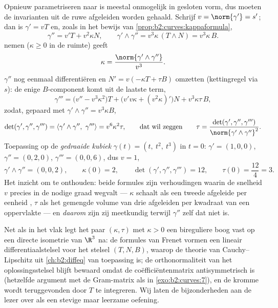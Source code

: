 \begin{example}\label{ex:b2:curves:twistedcubic}
Opnieuw parametriseren naar  is meestal onmogelijk in
gesloten vorm, dus moeten de invarianten uit de ruwe afgeleiden
worden gehaald. Schrijf $v = \norm{\gamma'} = s'$; dan is $\gamma'
= vT$ en, zoals in het bewijs van
\cref{prop:b2:curves:kappaformula},
\[
\gamma'' = v'T + v^2\kappa N,
\qquad
\gamma' \wedge \gamma'' = v^3\kappa\,(T \wedge N) =
v^3\kappa\,B .
\]
 nemen ($\kappa \geq 0$ in de ruimte) geeft
\[
\kappa = \frac{\norm{\gamma' \wedge \gamma''}}{v^3} .
\]
$\gamma''$ nog eenmaal differentiëren en $N' = v(-\kappa T + \tau
B)$ omzetten (kettingregel via $s$): de enige $B$-component komt
uit de laatste term,
\[
\gamma''' = \bigl(v'' - v^3\kappa^2\bigr)T +
\bigl(v'v\kappa + (v^2\kappa)'\bigr)N + v^3\kappa\tau\,B,
\]
zodat, gepaard met $\gamma' \wedge \gamma'' = v^3\kappa B$,
\[
\det(\gamma', \gamma'', \gamma''') = \langle\gamma' \wedge
\gamma'',\ \gamma'''\rangle = v^6\kappa^2\tau,
\qquad\text{dat wil zeggen}\qquad
\tau = \frac{\det(\gamma', \gamma'',
\gamma''')}{\norm{\gamma' \wedge \gamma''}^2} .
\]
Toepassing op de \emph{gedraaide kubiek} $\gamma(t) = (t,\ t^2,\
t^3)$ in $t = 0$: $\gamma' = (1, 0, 0)$, $\gamma'' = (0, 2, 0)$,
$\gamma''' = (0, 0, 6)$, dus $v = 1$,
\[
\gamma' \wedge \gamma'' = (0, 0, 2), \qquad \kappa(0) = 2,
\qquad
\det(\gamma', \gamma'', \gamma''') = 12, \qquad \tau(0) =
\frac{12}{4} = 3 .
\]
Het inzicht om te onthouden: beide formules zijn verhoudingen
waarin de snelheid $v$ precies in de nodige graad wegvalt ---
$\kappa$ schaalt als een tweede afgeleide per eenheid ,
$\tau$ als het gemengde volume van drie afgeleiden per kwadraat van
een oppervlakte --- en \emph{daarom} zijn zij meetkundig terwijl
$\gamma''$ zelf dat niet is.
\end{example}

\begin{remark}
Net als in het vlak legt het paar $(\kappa, \tau)$ met $\kappa > 0$
een bireguliere boog vast op een directe isometrie van $\R^3$ na:
de formules van Frenet vormen een lineair differentiaalstelsel voor
het stelsel $(T, N, B)$, waarop de theorie van Cauchy--Lipschitz
uit \cref{ch:b2:diffeq} van toepassing is; de orthonormaliteit van
het oplossingsstelsel blijft bewaard omdat de coëfficiëntenmatrix
antisymmetrisch is (hetzelfde argument met de Gram-matrix als in
\cref{exo:b2:curves:7}), en de kromme wordt teruggevonden door $T$
te integreren. Wij laten de bijzonderheden aan de lezer over als
een stevige maar leerzame oefening.
\end{remark}


